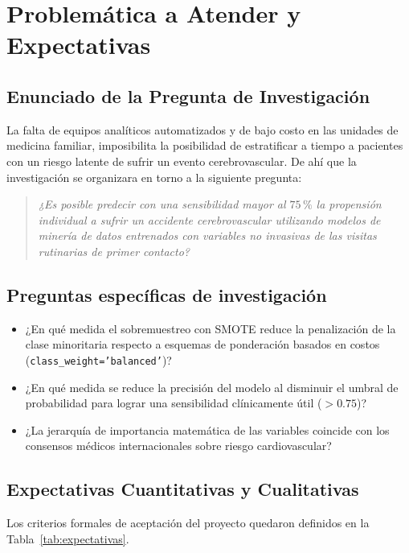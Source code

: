 \documentclass[12pt,a4paper]{article}
\begin{document}
\section{Problemática a Atender y Expectativas}

\subsection{Enunciado de la Pregunta de Investigación}
La falta de equipos analíticos automatizados y de bajo costo en las unidades de medicina familiar, imposibilita la posibilidad de estratificar a tiempo a pacientes con un riesgo latente de sufrir un evento cerebrovascular. De ahí que la investigación se organizara en torno a la siguiente pregunta:

\begin{quote}
\textit{¿Es posible predecir con una sensibilidad mayor al $75\,\%$ la propensión individual a sufrir un accidente cerebrovascular utilizando modelos de minería de datos entrenados con variables no invasivas de las visitas rutinarias de primer contacto?}
\end{quote}

\subsection{Preguntas específicas de investigación}
\begin{itemize}[leftmargin=1.2cm,itemsep=0.2em]
    \item ¿En qué medida el sobremuestreo con SMOTE reduce la penalización de la clase minoritaria respecto a esquemas de ponderación basados en costos (\texttt{class\_weight='balanced'})?
    \item ¿En qué medida se reduce la precisión del modelo al disminuir el umbral de probabilidad para lograr una sensibilidad clínicamente útil ($> 0.75$)?
    \item ¿La jerarquía de importancia matemática de las variables coincide con los consensos médicos internacionales sobre riesgo cardiovascular?
\end{itemize}

\subsection{Expectativas Cuantitativas y Cualitativas}
Los criterios formales de aceptación del proyecto quedaron definidos en la Tabla~\ref{tab:expectativas}.
\end{document}
